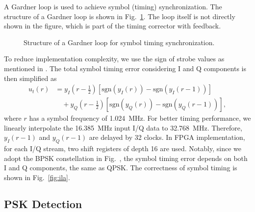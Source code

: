 \documentclass[journal,twoside]{IEEEtran}
\begin{document}
      A Gardner loop \cite{gardner1986bpsk} is used to achieve symbol (timing) synchronization.
      The structure of a Gardner loop is shown in Fig.~\ref{fig:gardner_loop}.
      The loop itself is not directly shown in the figure,
      which is part of the timing corrector with feedback.
      \begin{figure}[htbp]
        
        \caption{Structure of a Gardner loop for symbol timing synchronization.}
        \label{fig:gardner_loop}
      \end{figure}

      To reduce implementation complexity, we use the sign of strobe values as mentioned in \cite{gardner1986bpsk}.
      The total symbol timing error considering I and Q components is then simplified as
      \begin{equation}
        \begin{aligned}
          u_t(r)&=y_I(r-\tfrac12)\left[\mathrm{sgn}\left(y_I(r)\right)-\mathrm{sgn}\left(y_I(r-1)\right)\right] \\
          &\quad{}+y_Q(r-\tfrac12)\left[\mathrm{sgn}\left(y_Q(r)\right)-\mathrm{sgn}\left(y_Q(r-1)\right)\right],
        \end{aligned}
      \end{equation}
      where $r$ has a symbol frequency of \qty{1.024}{MHz}.
      For better timing performance, we linearly interpolate the \qty{16.385}{MHz} input I/Q data to \qty{32.768}{MHz}.
      Therefore, $y_I(r-1)$ and $y_Q(r-1)$ are delayed by 32 clocks.
      In FPGA implementation, for each I/Q stream, two shift registers of depth 16 are used.
      Notably, since we adopt the BPSK constellation in Fig.~,
      the symbol timing error depends on both I and Q components, the same as QPSK.
      The correctness of symbol timing is shown in Fig.~\ref{fig:ila}.

    \subsection{PSK Detection}
\end{document}
